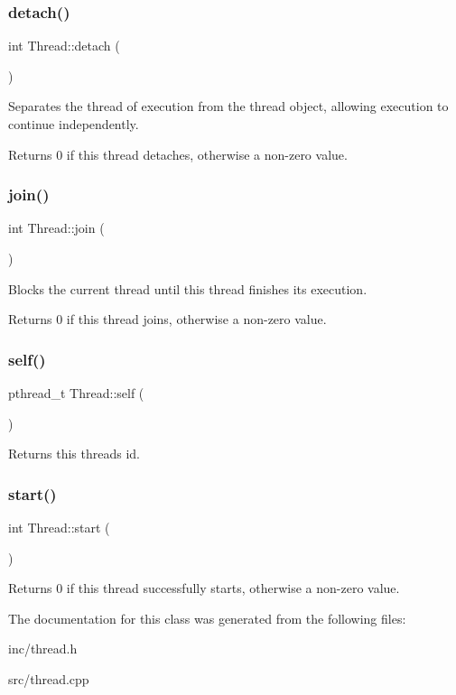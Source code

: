 \subsubsection{\texorpdfstring{detach()}{detach()}}
{\footnotesize\ttfamily int Thread\+::detach (\begin{DoxyParamCaption}{ }\end{DoxyParamCaption})}

Separates the thread of execution from the thread object, allowing execution to continue independently. \begin{DoxyReturn}{Returns}
0 if this thread detaches, otherwise a non-\/zero value. 
\end{DoxyReturn}
\mbox{\label{classThread_a7c3b04b32b4327923cc4c9553a403e32}} 
\subsubsection{\texorpdfstring{join()}{join()}}
{\footnotesize\ttfamily int Thread\+::join (\begin{DoxyParamCaption}{ }\end{DoxyParamCaption})}

Blocks the current thread until this thread finishes its execution. \begin{DoxyReturn}{Returns}
0 if this thread joins, otherwise a non-\/zero value. 
\end{DoxyReturn}
\mbox{\label{classThread_ad4242a739c70bd1fe6b9c6e208714310}} 
\subsubsection{\texorpdfstring{self()}{self()}}
{\footnotesize\ttfamily pthread\+\_\+t Thread\+::self (\begin{DoxyParamCaption}{ }\end{DoxyParamCaption})}

\begin{DoxyReturn}{Returns}
this thread\textquotesingle{}s id. 
\end{DoxyReturn}
\mbox{\label{classThread_a7d563f3201d081af8cc24ea552c6a4e4}} 
\subsubsection{\texorpdfstring{start()}{start()}}
{\footnotesize\ttfamily int Thread\+::start (\begin{DoxyParamCaption}{ }\end{DoxyParamCaption})}

\begin{DoxyReturn}{Returns}
0 if this thread successfully starts, otherwise a non-\/zero value. 
\end{DoxyReturn}


The documentation for this class was generated from the following files\+:\begin{DoxyCompactItemize}
\item 
inc/thread.\+h\item 
src/thread.\+cpp\end{DoxyCompactItemize}
